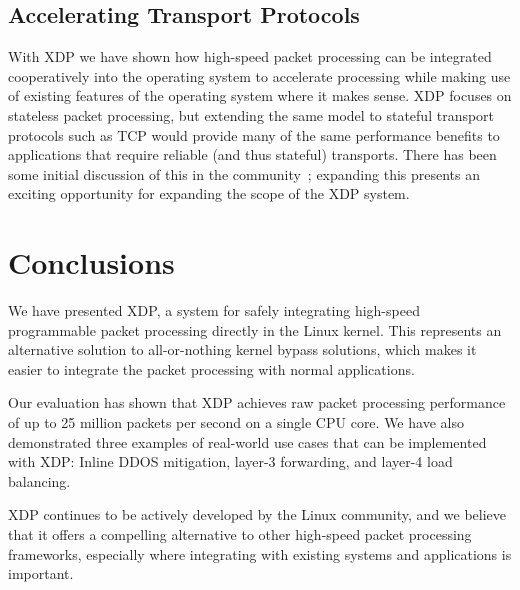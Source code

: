 \documentclass[10pt,sigconf,anonymous]{acmart}
\begin{document}
\subsection{Accelerating Transport Protocols}
\label{sec:accel-transp-prot}

With XDP we have shown how high-speed packet processing can be integrated
cooperatively into the operating system to accelerate processing while making
use of existing features of the operating system where it makes sense. XDP
focuses on stateless packet processing, but extending the same model to stateful
transport protocols such as TCP would provide many of the same performance
benefits to applications that require reliable (and thus stateful) transports.
There has been some initial discussion of this in the community~\cite{txdp};
expanding this presents an exciting opportunity for expanding the scope of the
XDP system.

\section{Conclusions}
\label{sec:conclusion}
We have presented XDP, a system for safely integrating high-speed programmable
packet processing directly in the Linux kernel. This represents an alternative
solution to all-or-nothing kernel bypass solutions, which makes it easier to
integrate the packet processing with normal applications.

Our evaluation has shown that XDP achieves raw packet processing performance of
up to 25 million packets per second on a single CPU core. We have also
demonstrated three examples of real-world use cases that can be implemented with
XDP: Inline DDOS mitigation, layer-3 forwarding, and layer-4 load balancing.

XDP continues to be actively developed by the Linux community, and we believe
that it offers a compelling alternative to other high-speed packet processing
frameworks, especially where integrating with existing systems and applications
is important.



\end{document}
